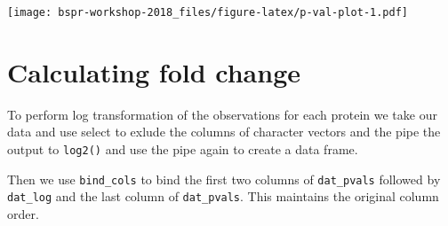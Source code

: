 \documentclass[12pt,]{book}
\newenvironment{Shaded}{\begin{snugshade}}{\end{snugshade}}
\newcommand{\CommentTok}[1]{\textcolor[rgb]{0.56,0.35,0.01}{\textit{#1}}}
\newcommand{\DataTypeTok}[1]{\textcolor[rgb]{0.13,0.29,0.53}{#1}}
\newcommand{\DecValTok}[1]{\textcolor[rgb]{0.00,0.00,0.81}{#1}}
\newcommand{\FloatTok}[1]{\textcolor[rgb]{0.00,0.00,0.81}{#1}}
\newcommand{\KeywordTok}[1]{\textcolor[rgb]{0.13,0.29,0.53}{\textbf{#1}}}
\newcommand{\NormalTok}[1]{#1}
\newcommand{\OperatorTok}[1]{\textcolor[rgb]{0.81,0.36,0.00}{\textbf{#1}}}
\newcommand{\StringTok}[1]{\textcolor[rgb]{0.31,0.60,0.02}{#1}}
\begin{document}
\begin{Shaded}
\end{Shaded}

\texttt{[image: bspr-workshop-2018\_files/figure-latex/p-val-plot-1.pdf]}

\hypertarget{calculating-fold-change}{%
\section{Calculating fold change}\label{calculating-fold-change}}

To perform log transformation of the observations for each protein we take our
data and use select to exlude the columns of character vectors and the pipe the
output to \texttt{log2()} and use the pipe again to create a data frame.

Then we use \texttt{bind\_cols} to bind the first two columns of \texttt{dat\_pvals} followed
by \texttt{dat\_log} and the last column of \texttt{dat\_pvals}. This maintains the original
column order.

\begin{Shaded}
\end{Shaded}
\end{document}
